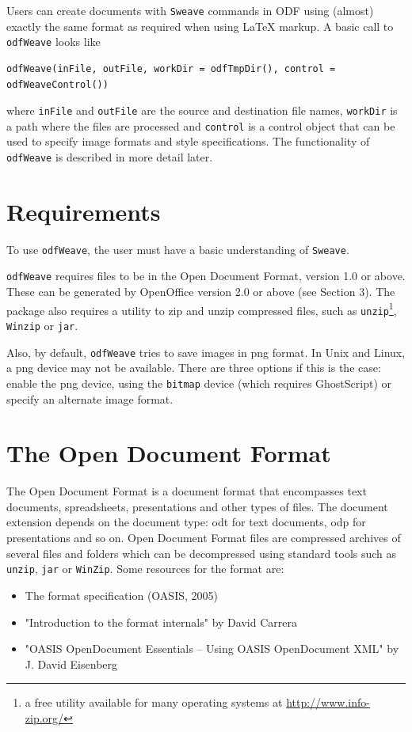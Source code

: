 \documentclass[12pt]{article}
\newcommand{\odfWeave}{{\tt odfWeave}\xspace}
\newcommand{\odfWeaveFunc}{{\tt odfWeave}\xspace}
\begin{document}
Users can create documents with \texttt{Sweave} commands in ODF using (almost) exactly the same format as required when using \LaTeX{} markup. A basic call to \odfWeaveFunc looks like
\begin{verbatim}
odfWeave(inFile, outFile, workDir = odfTmpDir(), control = odfWeaveControl())
\end{verbatim}
where \texttt{inFile} and \texttt{outFile} are the source and destination file names, \texttt{workDir} is a path where the files are processed and \texttt{control} is a control object that can be used to specify image formats and style specifications. The functionality of \odfWeave is described in more detail later.

\section{Requirements}

To use \odfWeave, the user must have a basic understanding of \texttt{Sweave}.

\odfWeave  requires files to be in the Open Document Format, version 1.0 or above. These can be generated by OpenOffice version 2.0 or above (see Section 3). The package also requires a utility to zip and unzip compressed files, such as \texttt{unzip}\footnote{a free utility available for many operating systems at \href{http://www.info-zip.org/} {http://www.info-zip.org/}}, \texttt{Winzip} or \texttt{jar}.

Also, by default, \odfWeaveFunc tries to save images in png format. In Unix and Linux, a png device may not be available. There are three options if this is the case: enable the png device, using the \texttt{bitmap} device (which requires GhostScript) or specify an alternate image format.



\section{The Open Document Format}

The Open Document Format is a document format that encompasses text documents, spreadsheets, presentations and other types of files. The document extension depends on the document type: odt for text documents, odp for presentations and so on. Open Document Format files are compressed archives of several files and folders which can be decompressed using standard tools such as \texttt{unzip}, \texttt{jar} or \texttt{WinZip}. Some resources for the format are:
\begin{itemize}
\item The format specification (OASIS, 2005)
\item "Introduction to the format internals" by David Carrera
\item "OASIS OpenDocument Essentials -- Using OASIS OpenDocument XML" by J. David Eisenberg
\end{itemize}
\end{document}
